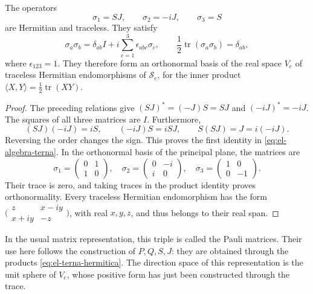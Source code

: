 \begin{proposition}
\label{prop:el-terna-hermitica}
The operators
\begin{equation}
 \sigma_1=SJ,\qquad \sigma_2=-iJ,\qquad \sigma_3=S
 \label{eq:el-terna-hermitica}
\end{equation}
are Hermitian and traceless. They satisfy
\begin{equation}
 \sigma_a\sigma_b
 =\delta_{ab}I+i\sum_{c=1}^3\epsilon_{abc}\sigma_c,
 \qquad
 \frac12\operatorname{tr}(\sigma_a\sigma_b)=\delta_{ab},
 \label{eq:el-algebra-terna}
\end{equation}
where \(\epsilon_{123}=1\). They therefore form an orthonormal basis
of the real space \(V_e\) of traceless Hermitian endomorphisms of
\(\mathscr S_e\), for the inner product
\(\langle X,Y\rangle=\frac12\operatorname{tr}(XY)\).
\end{proposition}
\begin{proof}
The preceding relations give \((SJ)^*=(-J)S=SJ\) and
\((-iJ)^*=-iJ\). The squares of all three matrices are \(I\).
Furthermore,
\[
 (SJ)(-iJ)=iS,\qquad (-iJ)S=iSJ,\qquad S(SJ)=J=i(-iJ).
\]
Reversing the order changes the sign. This proves the first identity
in \eqref{eq:el-algebra-terna}. In the orthonormal basis of the principal plane,
the matrices are
\[
 \sigma_1=\begin{pmatrix}0&1\\1&0\end{pmatrix},\quad
 \sigma_2=\begin{pmatrix}0&-i\\i&0\end{pmatrix},\quad
 \sigma_3=\begin{pmatrix}1&0\\0&-1\end{pmatrix}.
\]
Their trace is zero, and taking traces in the product identity proves
orthonormality. Every traceless Hermitian endomorphism has the form
\(\bigl(\begin{smallmatrix}z&x-iy\\x+iy&-z\end{smallmatrix}\bigr)\),
with real \(x,y,z\), and thus belongs to their real span.
\end{proof}

In the usual matrix representation, this triple is called the
Pauli matrices. Their use here follows the construction of
\(P,Q,S,J\): they are obtained through the products
\eqref{eq:el-terna-hermitica}. The direction space of this
representation is the unit sphere of \(V_e\), whose positive form
has just been constructed through the trace.

